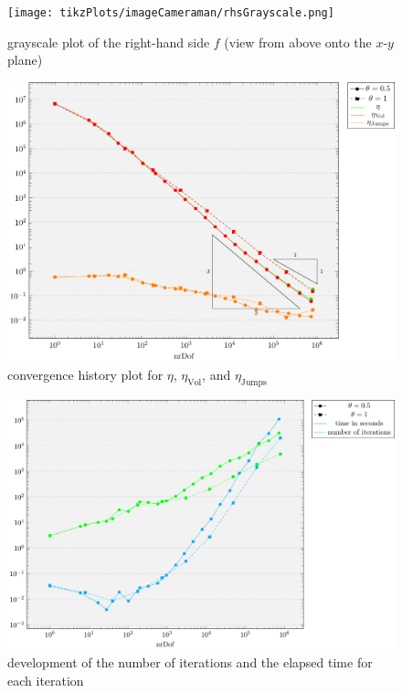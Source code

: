\documentclass[draft=false,twoside,12pt]{scrreprt}
\begin{document}
\begin{figure}[H]
	\centering
	\texttt{[image: tikzPlots/imageCameraman/rhsGrayscale.png]}
  \caption{grayscale plot of the right-hand side $f$ (view from above onto the
  $x$-$y$ plane)}
  \label{fig:rhsCameraman}
\end{figure}

\begin{figure}[H]
	\centering
	\includegraphics[width=14cm]
  {tikzPlots/imageCameraman/convergence.pdf}
  \caption{convergence history plot for $\eta$,
  $\eta_\text{Vol}$, and $\eta_\text{Jumps}$}
\end{figure}

\begin{figure}[H]
	\centering
	\includegraphics[width=14cm]{tikzPlots/imageCameraman/misc.pdf}
  \caption{development of the number of iterations and the elapsed time for 
  each iteration}
\end{figure}
\end{document}
